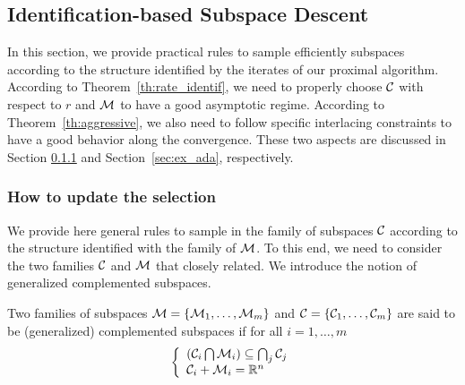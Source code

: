 \subsection{Identification-based Subspace Descent}\label{sec:adapt}

{
In this section, we provide practical rules to sample efficiently subspaces according to the structure identified by the iterates of our proximal algorithm. According to Theorem~\ref{th:rate_identif}, we need to properly choose $\mathcal{C}$ with respect to $r$ and $\mathcal{M}$ to have a good asymptotic regime. According to Theorem~\ref{th:aggressive},  we also need to follow specific interlacing constraints to have a good behavior along the convergence. These two aspects are discussed in Section \ref{sec:howto} and Section~\ref{sec:ex_ada}, respectively.}


\subsubsection{How to update the selection}
\label{sec:howto}

We provide here general rules to sample in the family of subspaces $\mathcal{C}$ according to the structure identified with the family of $\mathcal{M}$.
To this end, we need to consider the two families $\mathcal{C}$ and $\mathcal{M}$ that closely related. We introduce the notion of generalized {complemented subspaces}.

\begin{definition}
Two families of subspaces $\mathcal{M} = \{ \mathcal{M}_1,\ldots,\mathcal{M}_m\}$ and 
$\mathcal{C} = \{ \mathcal{C}_1,\ldots,\mathcal{C}_m\}$ are said to be (generalized)  {complemented subspaces} if for all $i=1,\ldots,m$
\[
  \left\{ \begin{array}{l}
    \left( \mathcal{C}_i \bigcap  \mathcal{M}_i  \right) \subseteq  \bigcap_j \mathcal{C}_j  \\
      \mathcal{C}_i  +  \mathcal{M}_i = \mathbb{R}^n
  \end{array} \right. 
\]
\end{definition}

